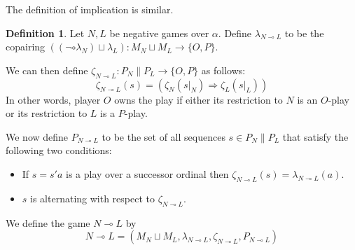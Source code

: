 \documentclass[11pt]{article} %
\theoremstyle{plain} %
\theoremstyle{definition} %
\newtheorem{definition}[theorem]{Definition}
\theoremstyle{exercisestyle}
\newcommand*\from{\colon}
\newcommand{\cmap}[3]{#1\from{}#2\to{}#3}
\renewcommand{\implies}{\multimap}
\newcommand{\cprd}{\sqcup}
\newcommand{\OP}{\{O,P\}}
\begin{document}
The definition of implication is similar.

\begin{definition}
  Let $N,L$ be negative games over $\alpha$.  Define $\lambda_{N\implies L}$ to be the copairing $\cmap{((\neg\circ\lambda_N)\cprd\lambda_L)}{M_N\cprd M_L}{\OP}$.  

  We can then define $\cmap{\zeta_{N\implies L}}{P_N\|P_L}{\OP}$ as follows:
  \[
    \zeta_{N\implies L}(s)=\left(\zeta_N(s\vert_N)\Rightarrow\zeta_L(s\vert_L)\right)
  \]
  In other words, player $O$ owns the play if either its restriction to $N$ is an $O$-play or its restriction to $L$ is a $P$-play.

  We now define $P_{N\implies L}$ to be the set of all sequences $s\in P_N\|P_L$ that satisfy the following two conditions:
  \begin{itemize}
    \item If $s=s'a$ is a play over a successor ordinal then $\zeta_{N\implies L}(s)=\lambda_{N\implies L}(a)$.
    \item $s$ is alternating with respect to $\zeta_{N\implies L}$.
  \end{itemize}
  We define the game $N\implies L$ by
  \[
    N\implies L=(M_N\cprd M_L,\lambda_{N\implies L},\zeta_{N\implies L},P_{N\implies L})
  \]
\end{definition}
\end{document}
